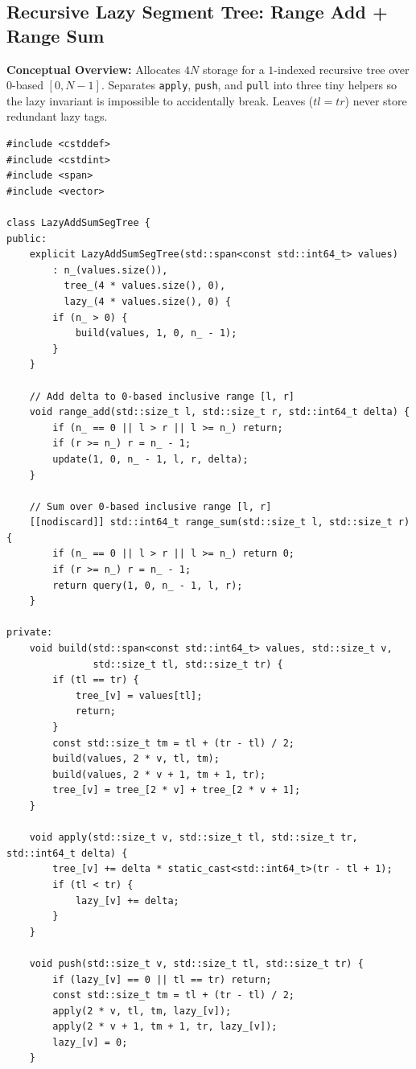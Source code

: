\documentclass[11pt,a4paper]{article}
\theoremstyle{definition}
\begin{document}
\subsection{Recursive Lazy Segment Tree: Range Add + Range Sum}

\textbf{Conceptual Overview:} Allocates $4N$ storage for a $1$-indexed recursive tree over $0$-based $[0, N - 1]$. Separates \texttt{apply}, \texttt{push}, and \texttt{pull} into three tiny helpers so the lazy invariant is impossible to accidentally break. Leaves ($tl = tr$) never store redundant lazy tags.

\begin{lstlisting}[caption={Recursive $4N$ Lazy Segment Tree for $O(\log N)$ range addition and range sum.}]
#include <cstddef>
#include <cstdint>
#include <span>
#include <vector>

class LazyAddSumSegTree {
public:
    explicit LazyAddSumSegTree(std::span<const std::int64_t> values)
        : n_(values.size()),
          tree_(4 * values.size(), 0),
          lazy_(4 * values.size(), 0) {
        if (n_ > 0) {
            build(values, 1, 0, n_ - 1);
        }
    }

    // Add delta to 0-based inclusive range [l, r]
    void range_add(std::size_t l, std::size_t r, std::int64_t delta) {
        if (n_ == 0 || l > r || l >= n_) return;
        if (r >= n_) r = n_ - 1;
        update(1, 0, n_ - 1, l, r, delta);
    }

    // Sum over 0-based inclusive range [l, r]
    [[nodiscard]] std::int64_t range_sum(std::size_t l, std::size_t r) {
        if (n_ == 0 || l > r || l >= n_) return 0;
        if (r >= n_) r = n_ - 1;
        return query(1, 0, n_ - 1, l, r);
    }

private:
    void build(std::span<const std::int64_t> values, std::size_t v,
               std::size_t tl, std::size_t tr) {
        if (tl == tr) {
            tree_[v] = values[tl];
            return;
        }
        const std::size_t tm = tl + (tr - tl) / 2;
        build(values, 2 * v, tl, tm);
        build(values, 2 * v + 1, tm + 1, tr);
        tree_[v] = tree_[2 * v] + tree_[2 * v + 1];
    }

    void apply(std::size_t v, std::size_t tl, std::size_t tr, std::int64_t delta) {
        tree_[v] += delta * static_cast<std::int64_t>(tr - tl + 1);
        if (tl < tr) {
            lazy_[v] += delta;
        }
    }

    void push(std::size_t v, std::size_t tl, std::size_t tr) {
        if (lazy_[v] == 0 || tl == tr) return;
        const std::size_t tm = tl + (tr - tl) / 2;
        apply(2 * v, tl, tm, lazy_[v]);
        apply(2 * v + 1, tm + 1, tr, lazy_[v]);
        lazy_[v] = 0;
    }


\end{lstlisting}
\end{document}
